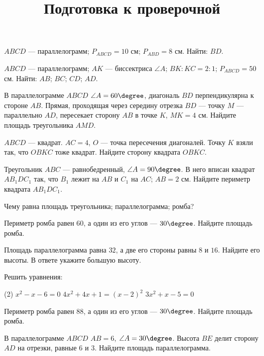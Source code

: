 \begin{class}[number=7]
	\title{Подготовка к проверочной}
	\begin{listofex}
		\item \( ABCD \) --- параллелограмм; \( P_{ABCD}=10 \) см; \( P_{ABD}=8 \)  см. Найти: \( BD \).
		\item \( ABCD \) --- параллелограмм; \( AK \) --- биссектриса \( \angle A \); \( BK:KC=2:1 \); \( P_{ABCD}=50 \) см. Найти: \( AB \); \( BC \); \( CD \); \( AD \).
		\item В параллелограмме \( ABCD \) \( \angle A = 60\degree \), диагональ \( BD \) перпендикулярна к стороне \( AB \). Прямая, проходящая через середину отрезка \( BD \) --- точку \( M \) --- параллельно \( AD \), пересекает сторону \( AB \) в точке \( K \), \( MK= 4 \) см. Найдите площадь треугольника \( AMD \).
		\item \( ABCD \) --- квадрат. \( AC=4 \), \( O \) --- точка пересечения диагоналей. Точку \( K \) взяли так, что \( OBKC \) тоже квадрат. Найдите сторону квадрата \( OBKC. \)
		\item Треугольник \( ABC \) --- равнобедренный, \( \angle A=90\degree \). В него вписан квадрат \( AB_1DC_1 \) так, что \( B_1 \) лежит на \( AB \) и \( C_1 \) на \( AC \); \( AB = 2 \) см. Найдите периметр квадрата \( AB_1DC_1  \).
		\item Чему равна площадь треугольника; параллелограмма; ромба?
		\item Периметр ромба равен \( 60 \), а один из его углов --- \( 30\degree \). Найдите площадь ромба.
		\item Площадь параллелограмма равна \( 32 \), а две его стороны равны \( 8 \) и \( 16 \). Найдите его высоты. В ответе укажите большую высоту.
		\item Решить уравнения:
		\begin{tasks}(2)
			\task \( x^2-x-6=0 \)
			\task \( 4x^2+4x+1=(x-2)^2 \)
			\task \( 3x^2+x-5=0 \)
		\end{tasks}
		\item {}
	\end{listofex}
\end{class}

\begin{exam}
	\begin{listofex}
		\item Периметр ромба равен \( 88 \), а один из его углов --- \( 30\degree \). Найдите площадь ромба.
		\item В параллелограмме \( ABCD \) \( AB=6 \), \( \angle A=30\degree \). Высота \( BE \) делит сторону \( AD \) на отрезки, равные \( 6 \) и \( 3 \). Найдите площадь параллелограмма.
	\end{listofex}
\end{exam}
